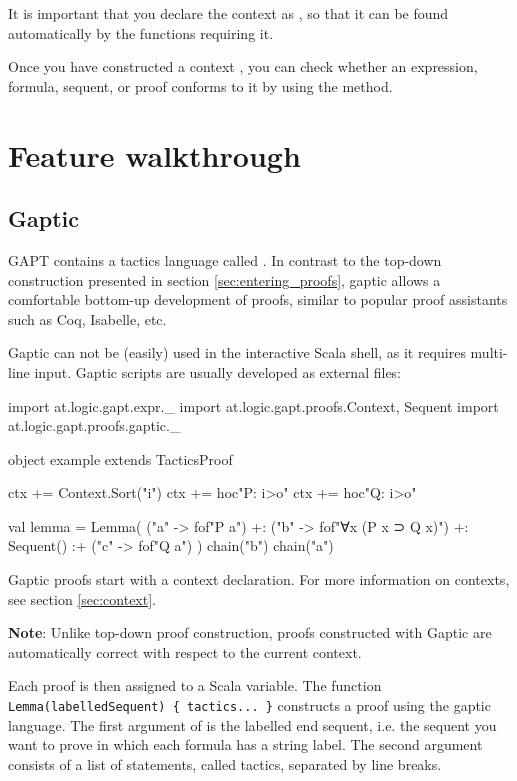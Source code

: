 \documentclass[a4paper,11pt]{article}
\newcommand{\cli}[1]{{\ttfamily {#1}}}
\begin{document}
It is important that you declare the context as \cli{implicit}, so that it can be found automatically
by the functions requiring it.

Once you have constructed a context \cli{ctx}, you can check whether an expression, formula, sequent, or proof conforms to it by using the \cli{check} method.


\section{Feature walkthrough}
\subsection{Gaptic}\label{sec:gaptic}

GAPT contains a tactics language called \cli{gaptic}.  In contrast to the
top-down construction presented in section \ref{sec:entering_proofs},
gaptic allows a comfortable bottom-up development of proofs, similar
to popular proof assistants such as Coq, Isabelle, etc.

Gaptic can not be (easily) used in the interactive Scala shell, as it requires
multi-line input.  Gaptic scripts are usually developed as external files:
\begin{tacticslisting}
import at.logic.gapt.expr._
import at.logic.gapt.proofs.{Context, Sequent}
import at.logic.gapt.proofs.gaptic._

object example extends TacticsProof {
  ctx += Context.Sort("i")
  ctx += hoc"P: i>o"
  ctx += hoc"Q: i>o"

  val lemma = Lemma(
    ("a" -> fof"P a") +:
    ("b" -> fof"∀x (P x ⊃ Q x)") +:
    Sequent()
    :+ ("c" -> fof"Q a")
  ) {
    chain("b")
    chain("a")
  }
}
\end{tacticslisting}
\begin{tacticsoutput}
\end{tacticsoutput}

Gaptic proofs start with a context declaration. For more information on
contexts, see section \ref{sec:context}.

\textbf{Note}: Unlike top-down proof construction, proofs constructed with Gaptic
are automatically correct with respect to the current context.

Each proof is then assigned to a Scala variable.  The function
\verb,Lemma(labelledSequent) { tactics... }, constructs a proof using the
gaptic language.  The first argument of \cli{Lemma} is the labelled end
sequent, i.e. the sequent you want to prove in which each formula has a string
label.  The second argument consists of a list of statements, called tactics,
separated by line breaks.
\end{document}
